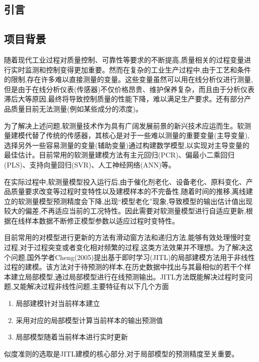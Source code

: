 \documentclass[11pt,a4paper]{elegantpaper}
\begin{document}
\begin{multicols}{2}
\section{引言}

\subsection{项目背景}

随着现代工业过程对质量控制、可靠性等要求的不断提高,质量相关的过程变量进行实时监测和控制变得更加重要。然而在复杂的工业生产过程中,由于工艺和条件的限制,存在许多难以直接测量的变量。这些变量虽然可以用在线分析仪进行测量,但是由于在线分析仪表(传感器)不仅价格昂贵、维护保养复杂，而且由于分析仪表滞后大等原因,最终将导致控制质量的性能下降，难以满足生产要求。还有部分产品质量目前无法测量(例如某些成分的浓度)。

为了解决上述问题,软测量技术作为具有广阔发展前景的新兴技术应运而生。软测量建模代替了传统的传感器，其核心是对于一些难以测量的重要变量(主导变量),选择另外一些容易测量的变量(辅助变量)通过构建数学模型,以实现对主导变量的最佳估计。目前常用的软测量建模方法有主元回归(PCR)、偏最小二乘回归(PLS)、支持向量回归(SVR)、人工神经网络(ANN)等。

在实际过程中,软测量模型投入运行后,由于催化剂老化、设备老化、原料变化、产品质量要求改变等过程时变特性以及建模样本的不完备性,随着时间的推移,离线建立的软测量模型预测精度会下降,出现“模型老化”现象,导致模型的输出估计值出现较大的偏差,不再适应当前的工况特性。因此需要对软测量模型进行自适应更新,根据在线样本数据不断修正模型参数以适应过程时变特性。

目前常用的对模型进行更新的方法有滑动窗方法和递归方法,能够有效处理慢时变过程,对于过程突变或者变化相对频繁的过程,这类方法效果并不理想。为了解决这个问题,国外学者Cheng(2005)提出基于即时学习(JITL)的局部建模方法用于非线性过程的建模。该方法对于待预测的样本,在历史数据中找出与其最相似的若干个样本建立局部模型,通过局部模型进行在线预测输出。JITL方法既能解决过程时变问题,又能解决过程非线性问题,主要特征有以下几个方面

\begin{enumerate}
  \item 局部建模针对当前样本建立
  \item 采用对应的局部模型计算当前样本的输出预测值
  \item 局部模型随着当前样本进行实时更新
\end{enumerate}

似度准则的选取是JITL建模的核心部分,对于局部模型的预测精度至关重要。


\end{multicols}
\end{document}
